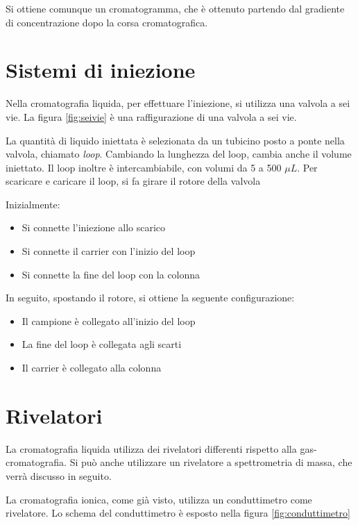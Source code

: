 Si ottiene comunque un cromatogramma, che è ottenuto partendo dal gradiente di concentrazione dopo la corsa cromatografica.

\section{Sistemi di iniezione}
Nella cromatografia liquida, per effettuare l'iniezione, si utilizza una valvola a sei vie. La figura \ref{fig:seivie} è una raffigurazione di una valvola a sei vie.


La quantità di liquido iniettata è selezionata da un tubicino posto a ponte nella valvola, chiamato \emph{loop}. Cambiando la lunghezza del loop, cambia anche il volume iniettato.
Il loop inoltre è intercambiabile, con volumi da 5 a 500 $\mu L$. Per scaricare e caricare il loop, si fa girare il rotore della valvola


Inizialmente:
\begin{itemize}
\item Si connette l'iniezione allo scarico
\item Si connette il carrier con l'inizio del loop
\item Si connette la fine del loop con la colonna
\end{itemize}

In seguito, spostando il rotore, si ottiene la seguente configurazione:
\begin{itemize}
\item Il campione è collegato all'inizio del loop
\item La fine del loop è collegata agli scarti
\item Il carrier è collegato alla colonna
\end{itemize}

\section{Rivelatori}
La cromatografia liquida utilizza dei rivelatori differenti rispetto alla gas-cromatografia. Si può anche utilizzare un rivelatore a spettrometria di massa, che verrà discusso in seguito.


La cromatografia ionica, come già visto, utilizza un conduttimetro come rivelatore.
Lo schema del conduttimetro è esposto nella figura \ref{fig:conduttimetro}


